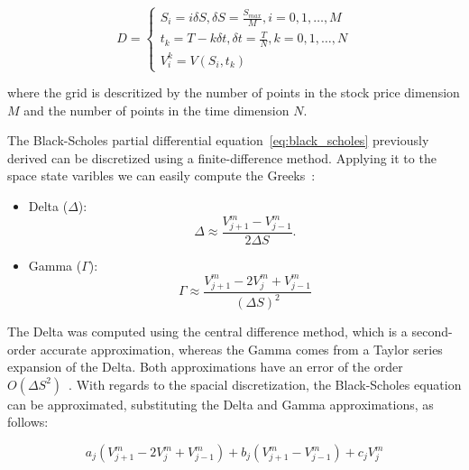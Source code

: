     \begin{equation}
        D =
            \begin{cases}
                S_i = i \delta S,   \delta S = \frac{S_{max}}{M},   i = 0, 1, \ldots, M \\
                t_k = T - k \delta t,   \delta t = \frac{T}{N}, k = 0, 1, \ldots, N \\
                V_{i}^{k} = V(S_i, t_k)
            \end{cases}
        \label{eq:grid_domain}
    \end{equation}

    where the grid is descritized by the number of points in the stock price dimension $M$
    and the number of points in the time dimension $N$.

    The Black-Scholes partial differential equation~\ref{eq:black_scholes} previously derived can be discretized
    using a finite-difference method.
    Applying it to the space state varibles we can easily compute the Greeks~\cite{hirsa_computational_2024}:

    \begin{itemize}
        \item Delta ($\Delta$):
            \begin{equation}
                \Delta \approx \frac{V_{j+1}^{m} - V_{j-1}^{m}}{2\Delta S}.
                \label{eq:greek_delta}
            \end{equation}

        \item Gamma ($\Gamma$):
            \begin{equation}
                \Gamma \approx \frac{V_{j+1}^{m} - 2V_{j}^{m} + V_{j-1}^{m}}{(\Delta S)^{2}}
                \label{eq:greek_gamma}
            \end{equation}
    \end{itemize}

    The Delta was computed using the central difference method, which is a second-order accurate approximation,
    whereas the Gamma comes from a Taylor series expansion of the Delta.
    Both approximations have an error of the order $O(\Delta S^2)$~\cite{wilmott_paul_2006}.
    With regards to the spacial discretization, the Black-Scholes equation can be approximated, substituting the
    Delta and Gamma approximations, as follows:

    \begin{equation}
        a_{j} \left( V_{j+1}^{m} - 2V_{j}^{m} + V_{j-1}^{m} \right)
        + b_{j} \left( V_{j+1}^{m} - V_{j-1}^{m} \right)
        + c_{j} V_{j}^{m}
        \label{eq:spacial_discretization}
    \end{equation}

